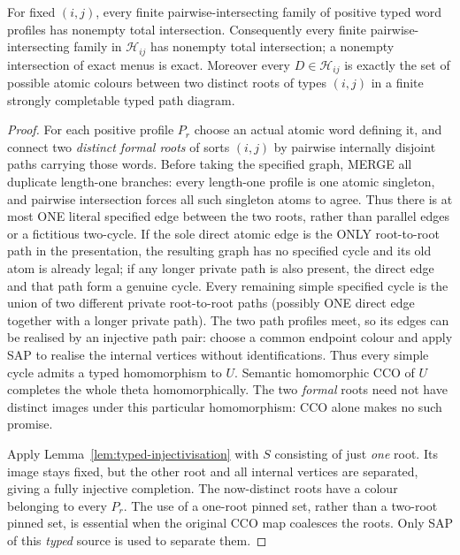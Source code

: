 \begin{lemma}
\label{lem:typed-helly}
For fixed $(i,j)$, every finite pairwise-intersecting family of
positive typed word profiles has nonempty total intersection.
Consequently every finite pairwise-intersecting family in
$\mathcal H_{ij}$ has nonempty total intersection; a nonempty
intersection of exact menus is exact.  Moreover every
$D\in\mathcal H_{ij}$ is exactly the set of possible atomic colours
between two distinct roots of types $(i,j)$ in a finite strongly
completable typed path diagram.
\end{lemma}
\begin{proof}
For each positive profile $P_r$ choose an actual atomic word defining
it, and connect two \emph{distinct formal roots} of sorts $(i,j)$ by
pairwise internally disjoint paths carrying those words. Before taking the
specified graph, MERGE all duplicate length-one branches: every
length-one profile is one atomic singleton, and pairwise intersection
forces all such singleton atoms to agree. Thus there is at most ONE
literal specified edge between the two roots, rather than parallel
edges or a fictitious two-cycle. If the sole direct atomic
edge is the ONLY root-to-root path in the presentation, the
resulting graph has no specified cycle and its old atom is
already legal; if any longer private path is also present,
the direct edge and that path form a genuine cycle.
Every remaining simple specified cycle is the union
of two different private root-to-root paths (possibly ONE direct
edge together with a longer private path).  The two path profiles meet, so
its edges can be realised by an injective path pair: choose a common
endpoint colour and apply SAP to realise the internal vertices
without identifications.  Thus every simple cycle admits a typed
homomorphism to $U$.  Semantic homomorphic CCO of $U$ completes the
whole theta homomorphically.  The two \emph{formal} roots need not
have distinct images under this particular homomorphism: CCO alone
makes no such promise.

Apply Lemma~\ref{lem:typed-injectivisation} with $S$ consisting
of just \emph{one} root.  Its image stays fixed, but the other root
and all internal vertices are separated, giving a fully injective
completion.  The now-distinct roots have a colour belonging to every
$P_r$.  The use of a one-root pinned set, rather than a two-root
pinned set, is essential when the original CCO map coalesces the
roots.  Only SAP of this \emph{typed} source is used to separate them.


\end{proof}
